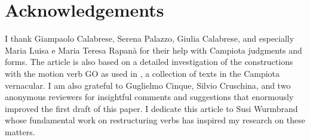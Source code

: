 \documentclass[output=paper]{langscibook}
\begin{document}
\section*{Acknowledgements}

I thank Giampaolo Calabrese, Serena Palazzo, Giulia Calabrese, and especially Maria Luisa e Maria Teresa Rapanà for their help with Campiota judgments and forms. The article is also based on a detailed investigation of the constructions with the motion verb GO as used in \citet{Todaro1989}, a collection of texts in the Campiota vernacular. I am also grateful to Guglielmo Cinque, Silvio Cruschina, and two anonymous reviewers for insightful comments and suggestions that enormously improved the first draft of this paper. I dedicate this article to Susi Wurmbrand whose fundamental work on restructuring verbs has inspired my research on these matters.

{\sloppy
    \printbibliography[heading=subbibliography,notkeyword=this]
}
\end{document}
